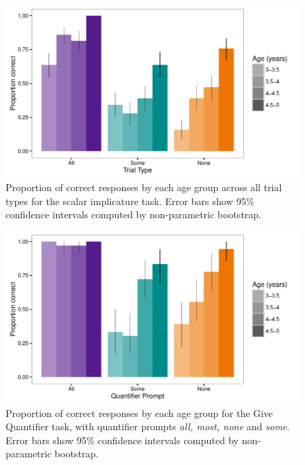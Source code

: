 \documentclass[man]{apa2}
\begin{document}
{\begin{figure}
 \begin{center}
  \includegraphics[width=6in]{figures/exp3_SIperformance.pdf}
  \caption{\label{fig:exp3_perf} Proportion of correct responses by each age group across all trial types for the scalar implicature task. Error bars show 95\% confidence intervals computed by non-parametric bootstrap.}
 \end{center}
\end{figure}

\begin{figure}
 \begin{center}
  \includegraphics[width=6in]{figures/exp3_GQperf.pdf}
  \caption{\label{fig:exp3_GQright} Proportion of correct responses by each age group for the Give Quantifier task, with quantifier prompts \textit{all, most, none} and \textit{some}. Error bars show 95\% confidence intervals computed by non-parametric bootstrap.}
 \end{center}
\end{figure}


}
\end{document}

